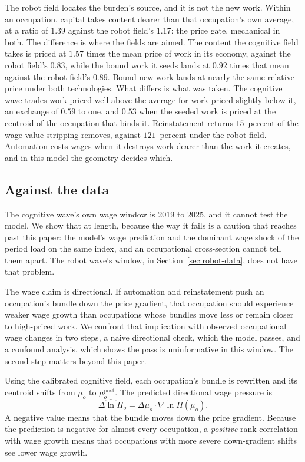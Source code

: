 \documentclass[12pt, a4paper]{article}
\begin{document}
The robot field locates the burden's source, and it
is not the new work. Within an occupation, capital takes content dearer
than that occupation's own average, at a ratio of $1.39$ against the
robot field's $1.17$: the price gate, mechanical in both. The difference
is where the fields are aimed. The content the cognitive field takes is
priced at $1.57$ times the mean price of work in its economy, against
the robot field's $0.83$, while the bound work it seeds lands at $0.92$
times that mean against the robot field's $0.89$. Bound new work lands
at nearly the same relative price under both technologies. What differs
is what was taken. The cognitive wave trades work priced well above the
average for work priced slightly below it, an exchange of $0.59$ to one,
and $0.53$ when the seeded work is priced at the centroid of the
occupation that binds it. Reinstatement returns $15$~percent of the wage
value stripping removes, against $121$~percent under the robot field.
Automation costs wages when it destroys work dearer than the work it
creates, and in this model the geometry decides which.

\subsection{Against the data}
\label{sec:cognitive-data}
\label{sec:directional-check}
\label{sec:check-confound}

The cognitive wave's own wage window is 2019 to 2025, and it cannot test
the model. We show that at length, because the way it fails is a caution
that reaches past this paper: the model's wage prediction and the
dominant wage shock of the period load on the same index, and an
occupational cross-section cannot tell them apart. The robot wave's
window, in Section~\ref{sec:robot-data}, does not have that problem.

The wage claim is directional. If automation and
reinstatement push an occupation's bundle down the price gradient, that
occupation should experience weaker wage growth than occupations whose
bundles move less or remain closer to high-priced work. We confront that
implication with observed occupational wage changes in two steps, a
naive directional check, which the model passes, and a confound
analysis, which shows the pass is uninformative in this window. The
second step matters beyond this paper.

Using the calibrated cognitive field, each occupation's bundle is
rewritten and its centroid shifts from $\mu_o$ to $\mu_o^{\text{post}}$. The
predicted directional wage pressure is
\begin{equation}
  \widehat{\Delta\ln\Pi}_o
  =
  \Delta\mu_o\cdot\nabla\ln\Pi(\mu_o).
  \label{eq:directional-pressure}
\end{equation}
A negative value means that the bundle moves down the price gradient.
Because the prediction is negative for almost every occupation, a
\emph{positive} rank correlation with wage growth means that occupations
with more severe down-gradient shifts see lower wage growth.
\end{document}
